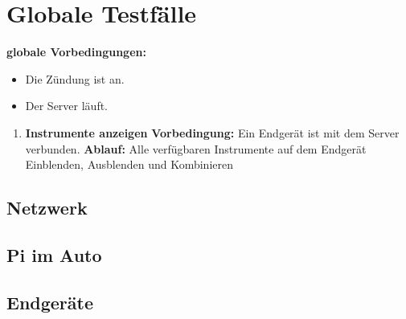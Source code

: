 \documentclass[pflichtenheft.tex]{subfiles}
\begin{document}
\chapter{Globale Testfälle}

\renewcommand{\theenumi}{/GT\ifnum \value{enumi}<10 0\fi\arabic{enumi}0/}
\renewcommand{\labelenumi}{\theenumi}
\renewcommand{\theenumii}{\arabic{enumii}}
\renewcommand{\labelenumii}{GT\ifnum \value{enumi}<10 0\fi\arabic{enumi}\arabic{enumii}/}

\textbf{globale Vorbedingungen:}
\begin{itemize}
\item
Die Zündung ist an.
\item
Der Server läuft.
\end{itemize}

\begin{enumerate}

\item{\textbf{Instrumente anzeigen}}
\textbf{Vorbedingung: } Ein Endgerät ist mit dem Server verbunden.
\textbf{Ablauf: } Alle verfügbaren Instrumente auf dem Endgerät Einblenden, Ausblenden und Kombinieren

\end{enumerate}

\section{Netzwerk}
\section{Pi im Auto}
\section{Endgeräte}
\end{document}
